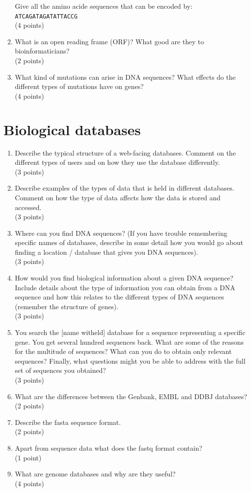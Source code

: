 \documentclass[11pt]{article}
\begin{document}
\begin{enumerate}
  Give all the amino acide sequences that can be encoded by:\\
  \verb|ATCAGATAGATATTACCG|\\
  (4 points)
\item What is an open reading frame (ORF)? What good are they to
  bioinformaticians?\\
  (2 points)
\item What kind of mutations can arise in DNA sequences? What effects
  do the different types of mutations have on genes?\\
  (4 points)
\end{enumerate}

\section{Biological databases}
\begin{enumerate}
\item Describe the typical structure of a web-facing databases. Comment on the
  different types of users and on how they use the database differently.\\
  (3 points)
\item Describe examples of the types of data that is held in different
  databases. Comment on how the type of data affects how the data is stored
  and accessed.\\
  (3 points)
\item Where can you find DNA sequences? (If you have trouble remembering
  specific names of databases, describe in some detail how you would go about finding a
  location / database that gives you DNA sequences).\\
  (3 points)
\item How would you find biological information about a given DNA sequence?
  Include details about the type of information you can obtain from a DNA
  sequence and how this relates to the different types of DNA sequences
  (remember the structure of genes).\\
  (3 points)
\item You search the [name witheld] database for a sequence representing a
  specific gene. You get several hundred sequences back. What are some of the reasons
  for the multitude of sequences? What can you do to obtain only relevant
  sequences? Finally, what questions might you be able to address with the
  full set of sequences you obtained?\\
  (3 points)
\item What are the differences between the Genbank, EMBL and DDBJ databases?\\
  (2 points)
\item Describe the fasta sequence format.\\
  (2 points)
\item Apart from sequence data what does the fastq format contain?\\
  (1 point)
\item What are genome databases and why are they useful?\\
  (4 points)
\end{enumerate}
\end{document}
